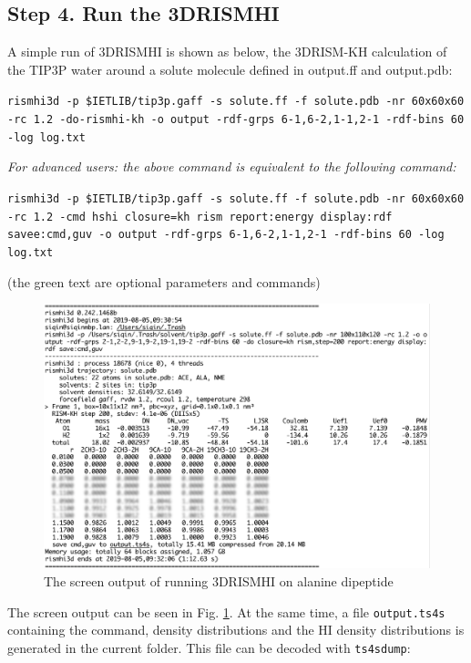 \documentclass[aip,amsmath,amssymb,reprint,onecolumn]{revtex4-1}
\begin{document}
\subsection*{Step 4. Run the 3DRISMHI}

A simple run of 3DRISMHI is shown as below, the 3DRISM-KH calculation of the TIP3P water around a solute molecule defined in output.ff and output.pdb:

\texttt{\color{blue}\small rismhi3d -p \$IETLIB/tip3p.gaff -s solute.ff -f solute.pdb -nr 60x60x60 -rc 1.2 -do-rismhi-kh -o output -rdf-grps 6-1,6-2,1-1,2-1 -rdf-bins 60 -log log.txt}


{\it For advanced users: the above command is equivalent to the following command:}

\texttt{\color{blue}\small rismhi3d -p \$IETLIB/tip3p.gaff -s solute.ff -f solute.pdb -nr 60x60x60 -rc 1.2 -cmd hshi closure=kh rism report:energy display:rdf savee:cmd,guv -o output -rdf-grps 6-1,6-2,1-1,2-1 -rdf-bins 60 -log log.txt}

{\small(the green text are optional parameters and commands)}

\begin{figure}[!ht]
	\centering
	\includegraphics[width=0.7\linewidth]{rismhi3d-demo-screen.png}
	\caption{The screen output of running 3DRISMHI on alanine dipeptide}
	\label{fig:demo-screen}
\end{figure}

The screen output can be seen in Fig. \ref{fig:demo-screen}. At the same time, a file \texttt{output.ts4s} containing the command, density distributions and the HI density distributions is generated in the current folder. This file can be decoded with \texttt{ts4sdump}:
\end{document}
